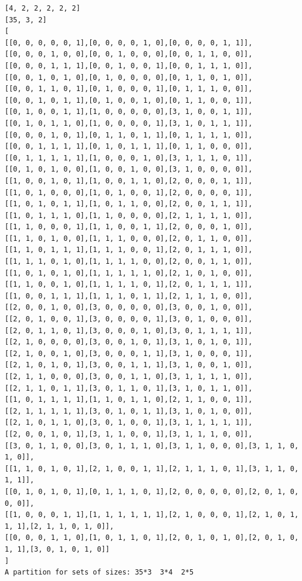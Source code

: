 \documentclass[final]{dmtcs-episciences}
\begin{document}
\begin{appendices}
\begin{verbatim} 
[4, 2, 2, 2, 2, 2]
[35, 3, 2]
[
[[0, 0, 0, 0, 0, 1],[0, 0, 0, 0, 1, 0],[0, 0, 0, 0, 1, 1]],
[[0, 0, 0, 1, 0, 0],[0, 0, 1, 0, 0, 0],[0, 0, 1, 1, 0, 0]],
[[0, 0, 0, 1, 1, 1],[0, 0, 1, 0, 0, 1],[0, 0, 1, 1, 1, 0]],
[[0, 0, 1, 0, 1, 0],[0, 1, 0, 0, 0, 0],[0, 1, 1, 0, 1, 0]],
[[0, 0, 1, 1, 0, 1],[0, 1, 0, 0, 0, 1],[0, 1, 1, 1, 0, 0]],
[[0, 0, 1, 0, 1, 1],[0, 1, 0, 0, 1, 0],[0, 1, 1, 0, 0, 1]],
[[0, 1, 0, 0, 1, 1],[1, 0, 0, 0, 0, 0],[3, 1, 0, 0, 1, 1]],
[[0, 1, 0, 1, 1, 0],[1, 0, 0, 0, 0, 1],[3, 1, 0, 1, 1, 1]],
[[0, 0, 0, 1, 0, 1],[0, 1, 1, 0, 1, 1],[0, 1, 1, 1, 1, 0]],
[[0, 0, 1, 1, 1, 1],[0, 1, 0, 1, 1, 1],[0, 1, 1, 0, 0, 0]],
[[0, 1, 1, 1, 1, 1],[1, 0, 0, 0, 1, 0],[3, 1, 1, 1, 0, 1]],
[[0, 1, 0, 1, 0, 0],[1, 0, 0, 1, 0, 0],[3, 1, 0, 0, 0, 0]],
[[1, 0, 0, 1, 0, 1],[1, 0, 0, 1, 1, 0],[2, 0, 0, 0, 1, 1]],
[[1, 0, 1, 0, 0, 0],[1, 0, 1, 0, 0, 1],[2, 0, 0, 0, 0, 1]],
[[1, 0, 1, 0, 1, 1],[1, 0, 1, 1, 0, 0],[2, 0, 0, 1, 1, 1]],
[[1, 0, 1, 1, 1, 0],[1, 1, 0, 0, 0, 0],[2, 1, 1, 1, 1, 0]],
[[1, 1, 0, 0, 0, 1],[1, 1, 0, 0, 1, 1],[2, 0, 0, 0, 1, 0]],
[[1, 1, 0, 1, 0, 0],[1, 1, 1, 0, 0, 0],[2, 0, 1, 1, 0, 0]],
[[1, 1, 0, 1, 1, 1],[1, 1, 1, 0, 0, 1],[2, 0, 1, 1, 1, 0]],
[[1, 1, 1, 0, 1, 0],[1, 1, 1, 1, 0, 0],[2, 0, 0, 1, 1, 0]],
[[1, 0, 1, 0, 1, 0],[1, 1, 1, 1, 1, 0],[2, 1, 0, 1, 0, 0]],
[[1, 1, 0, 0, 1, 0],[1, 1, 1, 1, 0, 1],[2, 0, 1, 1, 1, 1]],
[[1, 0, 0, 1, 1, 1],[1, 1, 1, 0, 1, 1],[2, 1, 1, 1, 0, 0]],
[[2, 0, 0, 1, 0, 0],[3, 0, 0, 0, 0, 0],[3, 0, 0, 1, 0, 0]],
[[2, 0, 1, 0, 0, 1],[3, 0, 0, 0, 0, 1],[3, 0, 1, 0, 0, 0]],
[[2, 0, 1, 1, 0, 1],[3, 0, 0, 0, 1, 0],[3, 0, 1, 1, 1, 1]],
[[2, 1, 0, 0, 0, 0],[3, 0, 0, 1, 0, 1],[3, 1, 0, 1, 0, 1]],
[[2, 1, 0, 0, 1, 0],[3, 0, 0, 0, 1, 1],[3, 1, 0, 0, 0, 1]],
[[2, 1, 0, 1, 0, 1],[3, 0, 0, 1, 1, 1],[3, 1, 0, 0, 1, 0]],
[[2, 1, 1, 0, 0, 0],[3, 0, 0, 1, 1, 0],[3, 1, 1, 1, 1, 0]],
[[2, 1, 1, 0, 1, 1],[3, 0, 1, 1, 0, 1],[3, 1, 0, 1, 1, 0]],
[[1, 0, 1, 1, 1, 1],[1, 1, 0, 1, 1, 0],[2, 1, 1, 0, 0, 1]],
[[2, 1, 1, 1, 1, 1],[3, 0, 1, 0, 1, 1],[3, 1, 0, 1, 0, 0]],
[[2, 1, 0, 1, 1, 0],[3, 0, 1, 0, 0, 1],[3, 1, 1, 1, 1, 1]],
[[2, 0, 0, 1, 0, 1],[3, 1, 1, 0, 0, 1],[3, 1, 1, 1, 0, 0]],
[[3, 0, 1, 1, 0, 0],[3, 0, 1, 1, 1, 0],[3, 1, 1, 0, 0, 0],[3, 1, 1, 0, 1, 0]],
[[1, 1, 0, 1, 0, 1],[2, 1, 0, 0, 1, 1],[2, 1, 1, 1, 0, 1],[3, 1, 1, 0, 1, 1]],
[[0, 1, 0, 1, 0, 1],[0, 1, 1, 1, 0, 1],[2, 0, 0, 0, 0, 0],[2, 0, 1, 0, 0, 0]],
[[1, 0, 0, 0, 1, 1],[1, 1, 1, 1, 1, 1],[2, 1, 0, 0, 0, 1],[2, 1, 0, 1, 1, 1],[2, 1, 1, 0, 1, 0]],
[[0, 0, 0, 1, 1, 0],[1, 0, 1, 1, 0, 1],[2, 0, 1, 0, 1, 0],[2, 0, 1, 0, 1, 1],[3, 0, 1, 0, 1, 0]]
]
A partition for sets of sizes: 35*3  3*4  2*5
\end{verbatim}
\newpage


\end{appendices}
\end{document}
